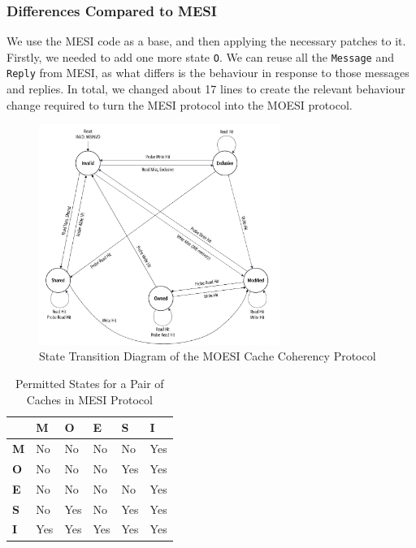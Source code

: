 \documentclass[nonacm,acmsmall,screen,11pt]{acmart}
\begin{document}
\subsubsection{Differences Compared to MESI}
We use the MESI code as a base, and then applying the necessary patches to it.
Firstly, we needed to add one more state \texttt{O}.
We can reuse all the \texttt{Message} and \texttt{Reply} from MESI, as what differs is the behaviour in response to those messages and replies.
In total, we changed about 17 lines to create the relevant behaviour change required to turn the MESI protocol into the MOESI protocol.

\begin{figure}[htb!]
  \centering
  \includegraphics[width=0.7\textwidth]{moesi}
  \caption{State Transition Diagram of the MOESI Cache Coherency Protocol}
  \label{fig:moesi}
\end{figure}

\begin{table}[htb!]
  \centering
  \caption{Permitted States for a Pair of Caches in MESI Protocol}
  \label{tab:moesi}
  \begin{tabular}{|l|l|l|l|l|l|}
    \hline
               & \textbf{M} & \textbf{O} & \textbf{E} & \textbf{S} & \textbf{I} \\ \hline
    \textbf{M} & No         & No         & No         & No         & Yes        \\ \hline
    \textbf{O} & No         & No         & No         & Yes        & Yes        \\ \hline
    \textbf{E} & No         & No         & No         & No         & Yes        \\ \hline
    \textbf{S} & No         & Yes        & No         & Yes        & Yes        \\ \hline
    \textbf{I} & Yes        & Yes        & Yes        & Yes        & Yes        \\ \hline
  \end{tabular}
\end{table}
\end{document}
